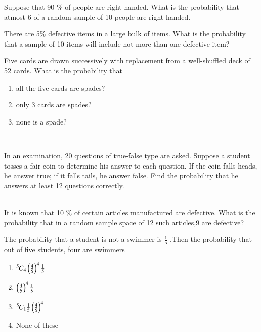 \item Suppose that 90 \% of people are right-handed. What is the probability that atmost 6 of a random sample of 10 people are right-handed. 
	\\
\solution

\item There are 5\% defective items in a large bulk of items. What is the probability that a sample of 10 items will include not more than one defective item?
	\\
\solution

\item Five cards are drawn successively with replacement from a well-shuffled deck
of 52 cards. What is the probability that
\begin{enumerate}
    \item all the five cards are spades?
    \item only 3 cards are spades?
    \item none is a spade?
\end{enumerate}
\solution
\\

\item In an examination, 20 questions of true-false type are asked. Suppose a student tosses a fair coin to determine his answer to each question. If the coin falls heads, he answer true; if it falls tails, he answer false. Find the probability that he answers at least 12 questions correctly.\\
\\
\solution

\item It is known that 10 $\%$ of certain articles manufactured are defective. What is the probability that in a random sample space of 12 such articles,9 are defective? \\
\solution

\item The probability that a student is not a swimmer is $\frac{1}{5}$ .Then the probability that out of five students, four are swimmers 
\begin{enumerate}
    \item ${{}^{5}\mkern-1muC_{4}}\left(\frac{4}{5}\right)^{4}\frac{1}{5}$ \label{item:9.3.6/1} \\
    \item $\left(\frac{4}{5}\right)^{4}\frac{1}{5}$ \label{item:9.3.6/2} \\
    \item \label{item:9.3.6/3}${{}^{5}\mkern-1muC_{1}}\frac{1}{5}\left(\frac{4}{5}\right)^{4}$\\
    \item \label{item:9.3.6/4}None of these
\end{enumerate}
